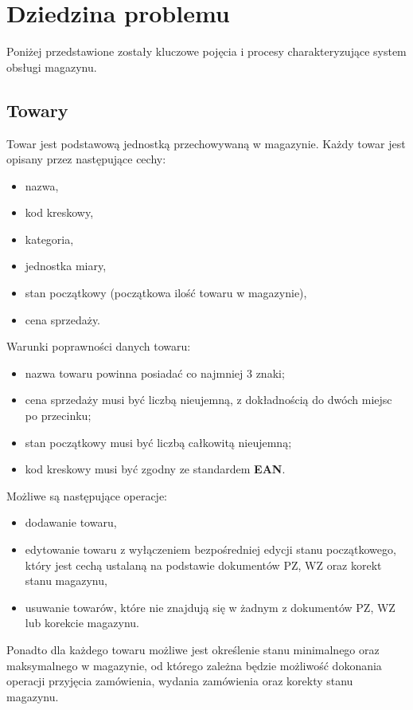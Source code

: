 \section{Dziedzina problemu}
\label{dziedzina-problemu}
Poniżej przedstawione zostały kluczowe pojęcia i procesy
charakteryzujące system obsługi magazynu.

\subsection{Towary}
Towar jest podstawową jednostką przechowywaną w magazynie. Każdy towar
jest opisany przez następujące cechy:
\begin{itemize}
\item nazwa,
\item kod kreskowy,
\item kategoria,
\item jednostka miary,
\item stan początkowy (początkowa ilość towaru w magazynie),
\item cena sprzedaży.
\end{itemize}

Warunki poprawności danych towaru:
\begin{itemize}
\item nazwa towaru powinna posiadać co najmniej 3 znaki;
\item cena sprzedaży musi być liczbą nieujemną, z dokładnością do
  dwóch miejsc po przecinku;
\item stan początkowy musi być liczbą całkowitą nieujemną;
\item kod kreskowy musi być zgodny ze standardem \textbf{EAN}.
\end{itemize}

Możliwe są następujące operacje:
\begin{itemize}
\item dodawanie towaru,
\item edytowanie towaru z wyłączeniem bezpośredniej edycji stanu
  początkowego, który jest cechą ustalaną na podstawie dokumentów PZ,
  WZ oraz korekt stanu magazynu,
\item usuwanie towarów, które nie znajdują się w żadnym z dokumentów
  PZ, WZ lub korekcie magazynu.
\end{itemize}

Ponadto dla każdego towaru możliwe jest określenie stanu minimalnego
oraz maksymalnego w magazynie, od którego zależna będzie możliwość
dokonania operacji przyjęcia zamówienia, wydania zamówienia oraz
korekty stanu magazynu.

